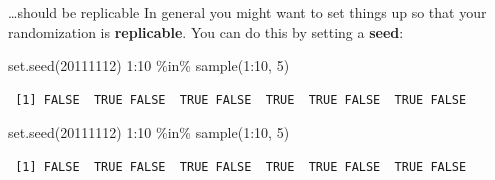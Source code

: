 \documentclass[
  11pt,
  ignorenonframetext,
]{beamer}
\newenvironment{Shaded}{\begin{snugshade}}{\end{snugshade}}
\newcommand{\DecValTok}[1]{\textcolor[rgb]{0.68,0.00,0.00}{#1}}
\newcommand{\FunctionTok}[1]{\textcolor[rgb]{0.28,0.35,0.67}{#1}}
\newcommand{\NormalTok}[1]{\textcolor[rgb]{0.00,0.23,0.31}{#1}}
\newcommand{\SpecialCharTok}[1]{\textcolor[rgb]{0.37,0.37,0.37}{#1}}
\begin{document}
\begin{frame}[fragile]{\ldots should be replicable}
\protect\hypertarget{should-be-replicable}{}
In general you might want to set things up so that your randomization is
\textbf{replicable}. You can do this by setting a \textbf{seed}:

\begin{Shaded}
\begin{Highlighting}[]
\FunctionTok{set.seed}\NormalTok{(}\DecValTok{20111112}\NormalTok{)}
\DecValTok{1}\SpecialCharTok{:}\DecValTok{10} \SpecialCharTok{\%in\%} \FunctionTok{sample}\NormalTok{(}\DecValTok{1}\SpecialCharTok{:}\DecValTok{10}\NormalTok{, }\DecValTok{5}\NormalTok{) }
\end{Highlighting}
\end{Shaded}

\begin{verbatim}
 [1] FALSE  TRUE FALSE  TRUE FALSE  TRUE  TRUE FALSE  TRUE FALSE
\end{verbatim}

\begin{Shaded}
\begin{Highlighting}[]
\FunctionTok{set.seed}\NormalTok{(}\DecValTok{20111112}\NormalTok{)}
\DecValTok{1}\SpecialCharTok{:}\DecValTok{10} \SpecialCharTok{\%in\%} \FunctionTok{sample}\NormalTok{(}\DecValTok{1}\SpecialCharTok{:}\DecValTok{10}\NormalTok{, }\DecValTok{5}\NormalTok{) }
\end{Highlighting}
\end{Shaded}

\begin{verbatim}
 [1] FALSE  TRUE FALSE  TRUE FALSE  TRUE  TRUE FALSE  TRUE FALSE
\end{verbatim}
\end{frame}
\end{document}
